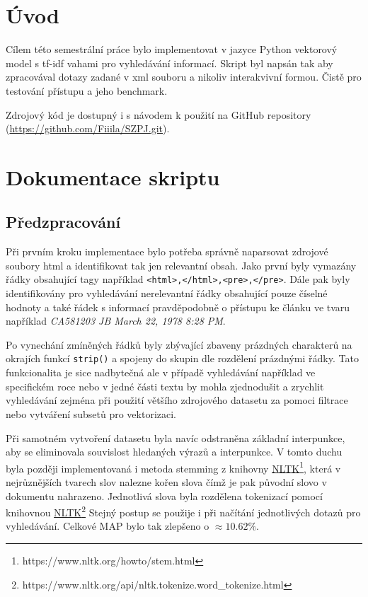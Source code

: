 \documentclass{article}
\begin{document}
	
	
	\tableofcontents
	
	
	
	
	\section{Úvod}
		Cílem této semestrální práce bylo implementovat v jazyce Python vektorový model s tf-idf vahami pro vyhledávání informací. Skript byl napsán tak aby zpracovával dotazy zadané v xml souboru a nikoliv interakvivní formou. Čistě pro testování přístupu a jeho benchmark.
		
		Zdrojový kód je dostupný i s návodem k použití na GitHub repository (\href{https://github.com/Fiiila/SZPJ.git}{https://github.com/Fiiila/SZPJ.git}).
		
	\section{Dokumentace skriptu}
		\subsection{Předzpracování}
			Při prvním kroku implementace bylo potřeba správně naparsovat zdrojové soubory html a identifikovat tak jen relevantní obsah. Jako první byly vymazány řádky obsahující tagy například \verb*|<html>,</html>,<pre>,</pre>|. Dále pak byly identifikovány pro vyhledávání nerelevantní řádky obsahující pouze číselné hodnoty a také řádek s informací pravděpodobně o přístupu ke článku ve tvaru například \textit{CA581203 JB March 22, 1978  8:28 PM}.
			
			Po vynechání zmíněných řádků byly zbývající zbaveny prázdných charakterů na okrajích funkcí \verb*|strip()| a spojeny do skupin dle rozdělení prázdnými řádky. Tato funkcionalita je sice nadbytečná ale v případě vyhledávání například ve specifickém roce nebo v jedné části textu by mohla zjednodušit a zrychlit vyhledávání zejména při použití většího zdrojového datasetu za pomoci filtrace nebo vytváření subsetů pro vektorizaci.
			
			Při samotném vytvoření datasetu byla navíc odstraněna základní interpunkce, aby se eliminovala souvislost hledaných výrazů a interpunkce. V tomto duchu byla později implementovaná i metoda stemming z knihovny \href{https://www.nltk.org/howto/stem.html}{NLTK}\footnote{https://www.nltk.org/howto/stem.html}, která v nejrůznějších tvarech slov nalezne kořen slova čímž je pak původní slovo v dokumentu nahrazeno. Jednotlivá slova byla rozdělena tokenizací pomocí knihovnou \href{https://www.nltk.org/api/nltk.tokenize.word_tokenize.html}{NLTK}\footnote{https://www.nltk.org/api/nltk.tokenize.word\_tokenize.html} Stejný postup se použije i při načítání jednotlivých dotazů pro vyhledávání. Celkové MAP bylo tak zlepšeno o \(\approx10.62\%\).
			
\end{document}
